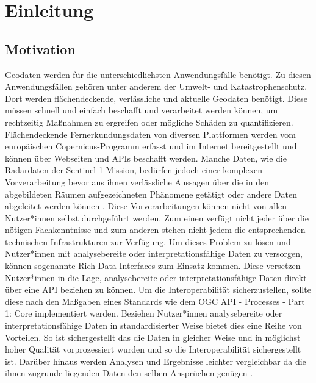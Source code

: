\newpage
\restoregeometry
\section{Einleitung}
\subsection{Motivation}
Geodaten werden für die unterschiedlichsten Anwendungsfälle benötigt.
Zu diesen Anwendungsfällen gehören unter anderem der Umwelt- und Katastrophenschutz. Dort werden flächendeckende,
verlässliche und aktuelle Geodaten benötigt. Diese müssen schnell und einfach beschafft und verarbeitet werden können,
um rechtzeitig Maßnahmen zu ergreifen oder mögliche Schäden zu quantifizieren. 
Flächendeckende Fernerkundungsdaten von diversen Plattformen werden vom europäischen Copernicus-Programm 
erfasst und im Internet bereitgestellt und können über Webseiten und APIs beschafft werden. 
Manche Daten, wie die Radardaten der Sentinel-1 Mission, bedürfen jedoch einer komplexen Vorverarbeitung bevor aus ihnen verlässliche Aussagen über die in den 
abgebildeten Räumen aufgezeichneten Phänomene getätigt oder andere Daten abgeleitet werden können \cite{radiometric_calibration_of_S1_level1_products}. 
Diese Vorverarbeitungen können nicht von allen Nutzer*innen selbst durchgeführt werden. Zum einen verfügt nicht jeder über die 
nötigen Fachkenntnisse und zum anderen stehen nicht jedem die entsprechenden technischen Infrastrukturen zur Verfügung. 
Um dieses Problem zu lösen und Nutzer*innen mit analysebereite oder interpretationsfähige Daten zu versorgen, 
können sogenannte Rich Data Interfaces zum Einsatz kommen.  
Diese versetzen Nutzer*innen in die Lage, analysebereite oder interpretationsfähige Daten direkt über eine API beziehen zu können. 
Um die Interoperabilität sicherzustellen, sollte diese nach den Maßgaben eines Standards wie dem OGC API - Processes - Part 1: Core implementiert werden. 
Beziehen Nutzer*innen analysebereite oder interpretationsfähige Daten in standardisierter Weise bietet dies eine Reihe von Vorteilen.
So ist sichergestellt das die Daten in gleicher Weise und in möglichst hoher Qualität vorprozessiert wurden und so die Interoperabilität sichergestellt ist. 
Darüber hinaus werden Analysen und Ergebnisse leichter vergleichbar da die ihnen zugrunde liegenden Daten den selben Ansprüchen genügen \cite{testbed_16}. 

